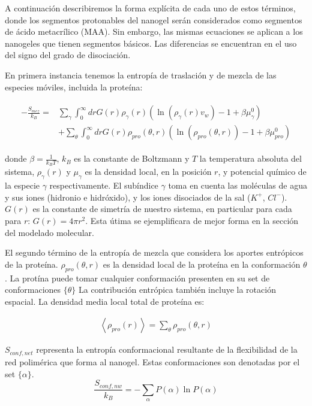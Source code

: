 A continuaci\'on describiremos la forma expl\'icita de cada uno de estos t\'erminos, donde los segmentos protonables del nanogel ser\'an considerados como segmentos de \'acido metacrílico (MAA). Sin embargo, las mismas ecuaciones se aplican a los nanogeles que tienen segmentos b\'asicos. Las diferencias se encuentran en el uso del signo del grado de disociaci\'on.

En primera instancia tenemos la entrop\'ia de traslaci\'on y de mezcla de las especies m\'oviles, incluida la prote\'ina:


\begin{align}
	\begin{aligned}
		-\frac{S_{mez}}{k_B}= &\sum_{\gamma}\int_0^\infty{dr G(r)\rho_\gamma(r)\left(\ln \left(\rho_\gamma (r)v_w\right) -1 + \beta\mu^0_\gamma\right)} \\
		&+ \sum_{\theta}\int_0^\infty{dr G(r)\rho_{pro}(\theta,r)\left(\ln \left(\rho_{pro}(\theta,r)\right) -1 + \beta\mu^0_{pro} \right)}
	\end{aligned}
\end{align}



\noindent donde $\beta = \frac{1}{k_BT}$, $k_B$ es la constante de Boltzmann y $T$ la temperatura absoluta del sistema, $\rho_\gamma(r)$ y $\mu_\gamma$ es la densidad local, en la posici\'on $r$, y potencial qu\'imico de la especie $\gamma$ respectivamente.
El sub\'indice $\gamma$ toma en cuenta las mol\'eculas de agua y sus iones (hidronio e hidr\'oxido), y los iones disociados de la sal ($K^+$, $Cl^-$). $G(r)$ es la constante de simetr\'ia de nuestro sistema, en particular para cada para $r$: $G(r) =4\pi r^2$. Esta \'utima se ejemplificara de mejor forma en la secci\'on del modelado molecular.

El segundo t\'ermino de la entrop\'ia de mezcla que considera los aportes entr\'opicos de la prote\'ina.
$\rho_{pro}(\theta,r)$ es la densidad local de la prote\'ina en la conformaci\'on  $\theta$.  La prot\'ina puede tomar cualquier conformaci\'on presenten en su set de conformaciones $\{\theta \}$
La contribuci\'on entr\'opica tambi\'en incluye la rotación espacial.
La densidad media local total de prote\'ina es: 


\begin{align}
	\left<\rho_{pro}(r)\right> = \sum_\theta{\rho_{pro}(\theta,r)}
\end{align}




$S_{conf,net}$ representa la entrop\'ia conformacional resultante de la flexibilidad de la red polim\'erica que forma al nanogel. Estas 
conformaciones son  denotadas por el set $\{\alpha\}$. 
\begin{equation}
	\frac{S_{conf,nw}}{k_B} = - \sum_{\alpha}{P(\alpha)\ln P(\alpha)}
\end{equation}


